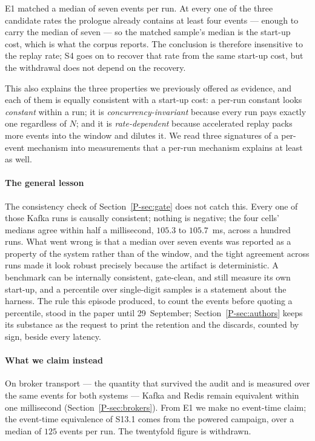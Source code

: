 \documentclass[10pt,journal,onecolumn]{IEEEtran}
\newcommand{\kafka}{Kafka}
\newcommand{\redis}{Redis}
\newcommand{\mainGate}{\ref{P-sec:gate}}            %
\newcommand{\mainBrokers}{\ref{P-sec:brokers}}        %
\newcommand{\mainAuthors}{\ref{P-sec:authors}}        %
\begin{document}
E1 matched a median of seven events per run. At every one of the three candidate rates the
prologue already contains at least four events --- enough to carry the median of seven --- so the
matched sample's median is the start-up cost, which is what the corpus reports. The conclusion is
therefore insensitive to the replay rate; S4 goes on to recover that rate from the same start-up cost, but the withdrawal does not depend on the recovery.

This also explains the three properties we previously offered as evidence, and each of them is
equally consistent with a start-up cost: a per-run constant looks \emph{constant} within a run;
it is \emph{concurrency-invariant} because every run pays exactly one regardless of $N$; and it
is \emph{rate-dependent} because accelerated replay packs more events into the window and
dilutes it. We read three signatures of a per-event mechanism into measurements that a per-run
mechanism explains at least as well.

\paragraph{The general lesson} The consistency check of Section~\mainGate{} does not catch this. Every one of those \kafka{} runs is causally consistent; nothing is negative; the four
cells' medians agree within half a millisecond, $105.3$ to $105.7$~ms, across a hundred runs. What went wrong is that a median over
seven events was reported as a property of the system rather than of the window, and the tight
agreement across runs made it look robust precisely because the artifact is deterministic. A
benchmark can be internally consistent, gate-clean, and still measure its own start-up, and a
percentile over single-digit samples is a statement about the harness. The rule this episode
produced, to count the events before quoting a percentile, stood in the paper until
29~September; Section~\mainAuthors{} keeps its substance as the request to print the retention
and the discards, counted by sign, beside every latency.

\paragraph{What we claim instead} On broker transport --- the quantity that survived the audit and is measured over the same events for both systems --- \kafka{} and
\redis{} remain equivalent within one millisecond (Section~\mainBrokers{}). From E1 we make no
event-time claim; the event-time equivalence of S13.1 comes from the powered campaign, over a
median of $125$ events per run. The twentyfold figure is withdrawn.
\end{document}
